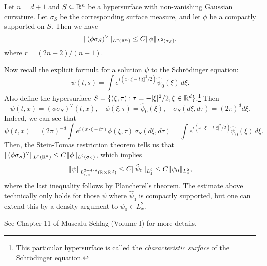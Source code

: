 \begin{theorem}
  Let $n = d + 1$ and $S \subseteq \mathbb{R}^n$ be a
  hypersurface with non-vanishing Gaussian curvature.
  Let $\sigma_S$ be the corresponding surface measure,
  and let $\phi$ be a compactly supported  on $S$.
  Then we have
  \[
    \|(\phi \sigma_S)^\vee\|_{L^r(\mathbb{R}^n)} \le
    C \|\phi\|_{L^2(\sigma_S)},
  \]
  where $r = (2n + 2) / (n - 1)$.
\end{theorem}

\begin{remark}
  Now recall the explicit formula for a solution $\psi$
  to the Schr\"odinger equation:
  \[
    \psi(t, s) = \int e^{i(x \cdot \xi - t |\xi|^2 / 2)} \widehat{\psi}_0(\xi)\, d\xi.
  \]
  Also define the hypersurface
  $S = \{(\xi, \tau) : \tau = -|\xi|^2 / 2, \xi \in \mathbb{R}^d\}$.\footnote{This particular hypersurface is called the \emph{characteristic surface} of the Schr\"odinger equation.}
  Then
  \[
    \psi(t, x) = (\phi \sigma_S)^\vee (t, x), \quad
    \phi(\xi, \tau) = \widehat{\psi}_0(\xi), \quad
    \sigma_S(d \xi, d \tau) = (2 \pi)^d d\xi.
  \]
  Indeed, we can see that
  \[
    \psi(t, x) = (2\pi)^{-d} \int e^{i(x \cdot \xi + t \tau)} \phi(\xi, \tau)\, \sigma_S(d \xi, d \tau)
    = \int e^{i(x \cdot \xi - t |\xi|^2 / 2)} \widehat{\psi}_0(\xi)\, d\xi.
  \]
  Then, the Stein-Tomas restriction theorem tells us
  that
  $\|(\phi \sigma_S)^\vee\|_{L^r(\mathbb{R}^n)} \le C \|\phi\|_{L^2(\sigma_S)}$,
  which implies
  \[
    \|\psi\|_{L^{2 + 4 / d}_{t, x}(\mathbb{R} \times \mathbb{R}^d)}
    \le C \|\widehat{\psi}_0\|_{L^2_\xi}
    \le C \|\psi_0\|_{L^2_x},
  \]
  where the last inequality follows by
  Plancherel's theorem. The estimate
  above technically only holds for those $\psi$
  where $\widehat{\psi}_0$ is compactly supported,
  but one can extend this by a density argument to
  $\psi_0 \in L^2_x$.

  See Chapter 11 of Muscalu-Schlag
  (Volume I) for more details.
\end{remark}
